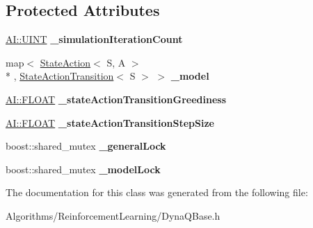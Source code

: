 \subsection*{Protected Attributes}
\begin{DoxyCompactItemize}
\item 
\hypertarget{classAI_1_1Algorithm_1_1DynaQBase_a3d375c3e01c7cc8a30c92109780adb9b}{\hyperlink{namespaceAI_ab6e14dc1e659854858a87e511f1439ec}{A\-I\-::\-U\-I\-N\-T} {\bfseries \-\_\-simulation\-Iteration\-Count}}\label{classAI_1_1Algorithm_1_1DynaQBase_a3d375c3e01c7cc8a30c92109780adb9b}

\item 
\hypertarget{classAI_1_1Algorithm_1_1DynaQBase_a1c9b96a2f0fa30d04d538b56ba008db4}{map$<$ \hyperlink{classAI_1_1StateAction}{State\-Action}$<$ S, A $>$\\*
, \hyperlink{classAI_1_1Algorithm_1_1StateActionTransition}{State\-Action\-Transition}$<$ S $>$ $>$ {\bfseries \-\_\-model}}\label{classAI_1_1Algorithm_1_1DynaQBase_a1c9b96a2f0fa30d04d538b56ba008db4}

\item 
\hypertarget{classAI_1_1Algorithm_1_1DynaQBase_ae3f83dbeea191fc8bdcd518a2e54af97}{\hyperlink{namespaceAI_a41b74884a20833db653dded3918e05c3}{A\-I\-::\-F\-L\-O\-A\-T} {\bfseries \-\_\-state\-Action\-Transition\-Greediness}}\label{classAI_1_1Algorithm_1_1DynaQBase_ae3f83dbeea191fc8bdcd518a2e54af97}

\item 
\hypertarget{classAI_1_1Algorithm_1_1DynaQBase_a1fd132ae0aeb356a891e5b81bf218338}{\hyperlink{namespaceAI_a41b74884a20833db653dded3918e05c3}{A\-I\-::\-F\-L\-O\-A\-T} {\bfseries \-\_\-state\-Action\-Transition\-Step\-Size}}\label{classAI_1_1Algorithm_1_1DynaQBase_a1fd132ae0aeb356a891e5b81bf218338}

\item 
\hypertarget{classAI_1_1Algorithm_1_1DynaQBase_adc3615604882454399863291f73b8734}{boost\-::shared\-\_\-mutex {\bfseries \-\_\-general\-Lock}}\label{classAI_1_1Algorithm_1_1DynaQBase_adc3615604882454399863291f73b8734}

\item 
\hypertarget{classAI_1_1Algorithm_1_1DynaQBase_ab166bd02d02f17c76a7626372c649849}{boost\-::shared\-\_\-mutex {\bfseries \-\_\-model\-Lock}}\label{classAI_1_1Algorithm_1_1DynaQBase_ab166bd02d02f17c76a7626372c649849}

\end{DoxyCompactItemize}


The documentation for this class was generated from the following file\-:\begin{DoxyCompactItemize}
\item 
Algorithms/\-Reinforcement\-Learning/Dyna\-Q\-Base.\-h\end{DoxyCompactItemize}
